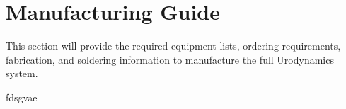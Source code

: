 \section{Manufacturing Guide}
This section will provide the required equipment lists, ordering requirements, fabrication, and soldering information to manufacture the full Urodynamics system. 

fdsgvae




\clearpage



\clearpage






\clearpage
